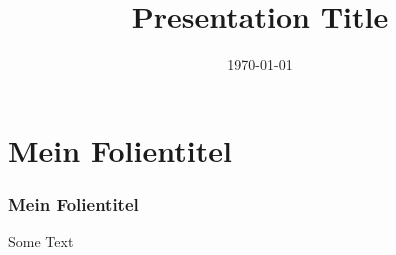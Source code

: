 \documentclass[10pt,]{beamer}
\title{Presentation Title}
\author{}
\date{\today}
\begin{document}
\maketitle

\section{ Mein Folientitel}
\begin{frame} %
	
  	\frametitle{ Mein Folientitel} %
	
	Some Text
	
\end{frame}
\end{document}
